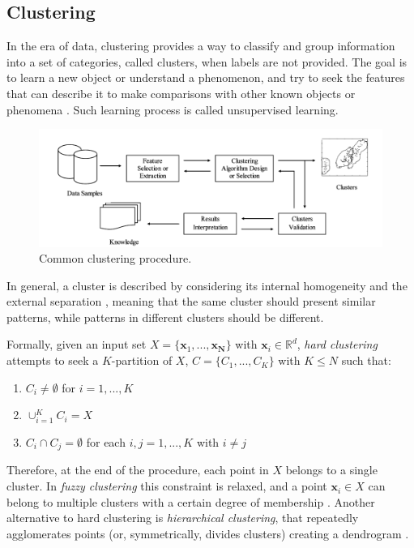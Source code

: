 \documentclass[a4paper, 12pt]{article} %
\begin{document}
	\subsection{Clustering } \label{ssec:clustering}
	In the era of data, clustering provides a way to classify and group information into a set of categories, called clusters, when labels are not provided. The goal is to learn a new object or understand a phenomenon, and try to seek the features that can describe it to make comparisons with other known objects or phenomena \cite{ClusteringSurvey}. Such learning process is called unsupervised learning.
	\begin{figure} 
		\includegraphics[width=\linewidth]{img/clustering_approach.png}
		\caption{Common clustering procedure.}
		\label{fig:clustering_approach}
	\end{figure}
	In general, a cluster is described by considering its internal homogeneity and the external separation \cite{ClusterHomogeinitySeparation}, meaning that the same cluster should present similar patterns, while patterns in different clusters should be different.
	
	Formally, given an input set $X = \{ \pmb{x}_1, ..., \pmb{x_N} \}$ with $\pmb{x}_i \in \mathbb{R}^d$, \textit{hard clustering} attempts to seek a $K$-partition of $X$, $C = \{ C_1, ..., C_K \}$ with $K \leq N$ such that:
	\begin{enumerate}
		\item $C_i \neq \emptyset$ for $i = 1, ..., K$
		\item $\cup_{i=1}^{K} C_i = X$
		\item $C_i \cap C_j = \emptyset$ for each $i, j = 1, ..., K$ with $i \neq j$
	\end{enumerate}
	Therefore, at the end of the procedure, each point in $X$ belongs to a single cluster. In \textit{fuzzy clustering} this constraint is relaxed, and a point $\pmb{x}_i \in X$ can belong to multiple clusters with a certain degree of membership \cite{FuzzyClustering}. Another alternative to hard clustering is \textit{hierarchical clustering}, that repeatedly agglomerates points (or, symmetrically, divides clusters) creating a dendrogram \cite{HierarchicalClustering}.  
	
\end{document}
